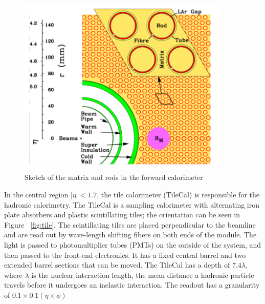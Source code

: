 \begin{figure}[h]
\begin{center}
\includegraphics*[width=0.90\textwidth] {figures/figure1-9.png}%
\caption[Sketch of the matrix and rods in the forward calorimeter]{Sketch of the matrix and rods in the forward calorimeter}
\label{fig:LAr_forward}
\end{center}
\end{figure}


\indent In the central region ${|\eta{}|<1.7}$, the tile calorimeter (TileCal) is responsible for the hadronic calorimetry. The TileCal is a sampling calorimeter with alternating iron plate absorbers and plastic scintillating tiles; the orientation can be seen in Figure ~\ref{fig:tile}. The scintillating tiles are placed perpendicular to the beamline and are read out by wave-length shifting fibers on both ends of the module. The light is passed to photomultiplier tubes (PMTs) on the outside of the system, and then passed to the front-end electronics. It has a fixed central barrel and two extended barrel sections that can be moved. The TileCal has a depth of ${7.4\lambda{}}$, where ${\lambda{}}$ is the nuclear interaction length, the mean distance a hadronic particle travels before it undergoes an inelastic interaction. The readout has a granularity of ${0.1\times0.1(\eta\times\phi)}$

